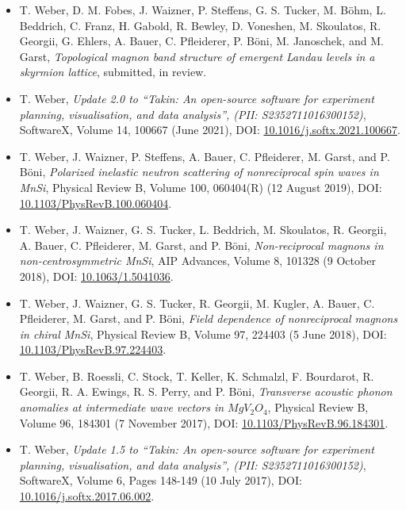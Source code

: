 \begin{itemize}
	\item T. Weber, D. M. Fobes, J. Waizner, P. Steffens, G. S. Tucker,
	M. B\"ohm, L. Beddrich, C. Franz, H. Gabold, R. Bewley,
	D. Voneshen, M. Skoulatos, R. Georgii, G. Ehlers, A. Bauer,
	C. Pfleiderer, P. B\"oni, M. Janoschek, and M. Garst, 
	\textit{Topological magnon band structure of emergent Landau levels in a skyrmion lattice},
	submitted, in review.

	\item T. Weber, \textit{Update 2.0 to ``Takin: An open-source software for experiment planning, visualisation, and data analysis'', (PII: S2352711016300152)},
	SoftwareX, Volume 14, 100667 (June 2021),
	DOI: \href{https://doi.org/10.1016/j.softx.2021.100667}{10.1016/j.softx.2021.100667}.

	\item T. Weber, J. Waizner, P. Steffens, A. Bauer, C. Pfleiderer, M. Garst, and P. B\"oni, 
	\textit{Polarized inelastic neutron scattering of nonreciprocal spin waves in MnSi},
	Physical Review B, Volume 100, 060404(R) (12 August 2019),
	DOI: \href{https://doi.org/10.1103/PhysRevB.100.060404}{10.1103/PhysRevB.100.060404}.

	\item  T. Weber, J. Waizner, G. S. Tucker, L. Beddrich, M. Skoulatos, R. Georgii, A. Bauer, C. Pfleiderer, M. Garst, and P. B\"oni, 
	\textit{Non-reciprocal magnons in non-centrosymmetric MnSi},
	AIP Advances, Volume 8, 101328 (9 October 2018),
	DOI: \href{https://doi.org/10.1063/1.5041036}{10.1063/1.5041036}.

	\item T. Weber, J. Waizner, G. S. Tucker, R. Georgii, M. Kugler, A. Bauer, C. Pfleiderer, M. Garst, and P. B\"oni, 
	\textit{Field dependence of nonreciprocal magnons in chiral MnSi},
	Physical Review B, Volume 97, 224403 (5 June 2018),
	DOI: \href{https://doi.org/10.1103/PhysRevB.97.224403}{10.1103/PhysRevB.97.224403}.

	\item T. Weber, B. Roessli, C. Stock, T. Keller, K. Schmalzl, F. Bourdarot, R. Georgii, R. A. Ewings, R. S. Perry, and P. B\"oni, 
	\textit{Transverse acoustic phonon anomalies at intermediate wave vectors in $MgV_2O_4$},
	Physical Review B, Volume 96, 184301 (7 November 2017),
	DOI: \href{https://doi.org/10.1103/PhysRevB.96.184301}{10.1103/PhysRevB.96.184301}.
	
	\item T. Weber, \textit{Update 1.5 to ``Takin: An open-source software for experiment planning, visualisation, and data analysis'', (PII: S2352711016300152)},
	SoftwareX, Volume 6, Pages 148-149 (10 July 2017),
	DOI: \href{https://doi.org/10.1016/j.softx.2017.06.002}{10.1016/j.softx.2017.06.002}.


\end{itemize}
